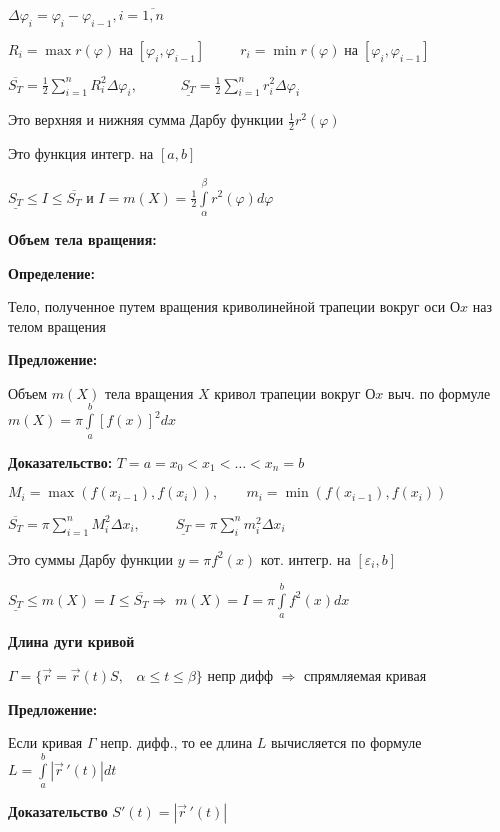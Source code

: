 \documentclass[a4paper,12pt]{article} %
\begin{document}
$\Delta \varphi_i = \varphi_i - \varphi_{i-1}, i = \overline{1, n}$

$R_i = \max r(\varphi)\; на\; [\varphi_i, \varphi_{i-1}]\;\;\;\;\;\;\;\;\; r_i=\min r(\varphi)\; на\; [\varphi_i, \varphi_{i-1}] $

$\overline{S_T} = \frac{1}{2}\sum\limits_{i=1}^n R_i^2 \Delta \varphi_i,\;\;\;\;\;\;\;\;\;\;\; \underline{S_T} =\frac{1}{2}\sum\limits_{i=1}^n r_i^2 \Delta \varphi_i$

Это верхняя и нижняя сумма Дарбу функции $\frac{1}{2}r^2(\varphi)$

Это функция интегр. на $[a, b]$

$\underline{S_T} \leq I \leq \overline{S_T}$ и $I = m(X) = \frac{1}{2}\int\limits_{\alpha}^{\beta}r^2(\varphi)d\varphi$

\textbf{Объем тела вращения:}

\textbf{Определение:}

Тело, полученное путем вращения криволинейной трапеции вокруг оси $Оx$ наз телом вращения

\vspace{20}

\textbf{Предложение:}

Объем $m(X)$ тела вращения $X$ кривол трапеции вокруг $Оx$ выч. по формуле $m(X) = \pi \int\limits_a^b[f(x)]^2dx$

\textbf{Доказательство:} $T={a=x_0<x_1<\dots<x_n = b}$

$M_i = \max (f(x_{i-1}), f(x_i)), \;\;\;\;\;\;\; m_i=\min (f(x_{i-1}), f(x_i))$

$\overline{S_T} = \pi \sum\limits_{i=1}^n M_i^2 \Delta x_i, \;\;\;\;\;\;\;\;\; \underline{S_T} = \pi \sum\limits_i^n m_i^2 \Delta x_i$

Это суммы Дарбу функции $y = \pi f^2(x)$ кот. интегр. на $[\varepsilon_i, b]$

$\underline{S_T} \leq m(X) = I \leq \overline{S_T} \Rightarrow$ $m(X) = I = \pi \int\limits_a^b f^2(x)dx$

\vspace{20}

\textbf{Длина дуги кривой}

$\Gamma = \{\Vec{r} = \Vec{r}(t)S,\;\;\; \alpha \leq t \leq \beta\}$ непр дифф $\Rightarrow$ спрямляемая кривая

\textbf{Предложение:}

Если кривая $\Gamma$ непр. дифф., то ее длина $L$ вычисляется по формуле $L=\int\limits_a^b |\Vec{r}\,'(t)|dt$

\textbf{Доказательство} $S'(t)=|\Vec{r}\,'(t)|$
\end{document}
